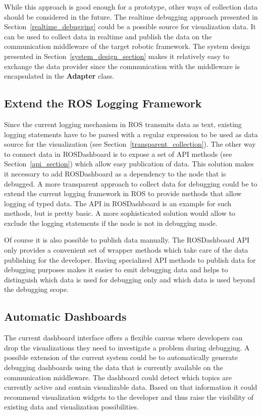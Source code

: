While this approach is good enough for a prototype, other ways of collection data should be considered in the future. The realtime debugging approach presented in Section~\ref{realtime_debugging} could be a possible source for visualization data. It can be used to collect data in realtime and publish the data on the communication middleware of the target robotic framework. The system design presented in Section~\ref{system_design_section} makes it relatively easy to exchange the data provider since the communication with the middleware is encapsulated in the \textbf{Adapter} class.

\subsection{Extend the ROS Logging Framework}
Since the current logging mechanism in ROS transmits data as text, existing logging statements have to be parsed with a regular expression to be used as data source for the visualization (see Section~\ref{transparent_collection}). The other way to connect data in ROSDashboard is to expose a set of API methods (see Section~\ref{api_section}) which allow easy publication of data. This solution makes it necessary to add ROSDashboard as a dependency to the node that is debugged. A more transparent approach to collect data for debugging could be to extend the current logging framework in ROS to provide methods that allow logging of typed data. The API in ROSDashboard is an example for such methods, but is pretty basic. A more sophisticated solution would allow to exclude the logging statements if the node is not in debugging mode.

Of course it is also possible to publish data manually. The ROSDashboard API only provides a convenient set of wrapper methods which take care of the data publishing for the developer. Having specialized API methods to publish data for debugging purposes makes it easier to emit debugging data and helps to distinguish which data is used for debugging only and which data is used beyond the debugging scope.

\subsection{Automatic Dashboards}
The current dashboard interface offers a flexible canvas where developers can drop the visualizations they need to investigate a problem during debugging. A possible extension of the current system could be to automatically generate debugging dashboards using the data that is currently available on the communication middleware. The dashboard could detect which topics are currently active and contain visualizable data. Based on that information it could recommend visualization widgets to the developer and thus raise the visibility of existing data and visualization possibilities.

